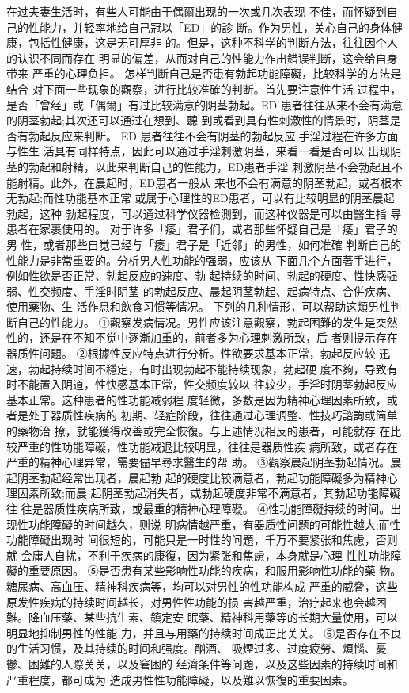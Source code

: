 \documentclass[12pt,UTF8]{ctexbook}
\begin{document}
在过夫妻生活时，有些人可能由于偶爾出现的一次或几次表现
不佳，而怀疑到自己的性能力，并轻率地给自己冠以「ED」的診
断。作为男性，关心自己的身体健康，包括性健康，这是无可厚非
的。但是，这种不科学的判断方法，往往因个人的认识不同而存在
明显的偏差，从而对自己的性能力作出錯误判断，这会给自身带来
严重的心理负担。
怎样判断自己是否患有勃起功能障礙，比较科学的方法是结合
对下面一些现象的觀察，进行比较准確的判断。首先要注意性生活
过程中，是否「曾经」或「偶爾」有过比较满意的阴茎勃起。ED
患者往往从来不会有满意的阴茎勃起;其次还可以通过在想到、聽
到或看到具有性刺激性的情景时，阴茎是否有勃起反应来判断。
ED 患者往往不会有阴茎的勃起反应;手淫过程在许多方面与性生
活具有同样特点，因此可以通过手淫刺激阴茎，来看一看是否可以
出现阴茎的勃起和射精，以此来判断自己的性能力，ED患者手淫
刺激阴茎不会勃起且不能射精。此外，在晨起时，ED患者一般从
来也不会有满意的阴茎勃起，或者根本无勃起;而性功能基本正常
或属于心理性的ED患者，可以有比较明显的阴茎晨起勃起，这种
勃起程度，可以通过科学仪器检測到，而这种仪器是可以由醫生指
导患者在家裹使用的。
对于许多「痿」君子们，或者那些怀疑自己是「痿」君子的男
性，或者那些自觉已经与「痿」君子是「近邻」的男性，如何准確
判断自己的性能力是非常重要的。分析男人性功能的强弱，应该从
下面几个方面著手进行，例如性欲是否正常、勃起反应的速度、勃
起持续的时间、勃起的硬度、性快感强弱、性交频度、手淫时阴茎
的勃起反应、晨起阴茎勃起、起病特点、合併疾病、使用藥物、生
活作息和飲食习惯等情况。
下列的几种情形，可以帮助这類男性判断自己的性能力。
①觀察发病情况。男性应该注意觀察，勃起困難的发生是突然
性的，还是在不知不觉中逐漸加重的，前者多为心理刺激所致，后
者则提示存在器质性问題。
②根據性反应特点进行分析。性欲要求基本正常，勃起反应较
迅速，勃起持续时间不穩定，有时出现勃起不能持续现象，勃起硬
度不夠，导致有时不能置入阴道，性快感基本正常，性交频度较以
往较少，手淫时阴茎勃起反应基本正常。这种患者的性功能减弱程
度轻微，多数是因为精神心理因素所致，或者是处于器质性疾病的
初期、轻症阶段，往往通过心理调整、性技巧諮詢或简单的藥物治
撩，就能獲得改善或完全恢復。与上述情况相反的患者，可能就存
在比较严重的性功能障礙，性功能减退比较明显，往往是器质性疾
病所致，或者存在严重的精神心理异常，需要儘早尋求醫生的帮
助。
③觀察晨起阴茎勃起情况。晨起阴茎勃起经常出现者，晨起勃
起的硬度比较满意者，勃起功能障礙多为精神心理因素所致;而晨
起阴茎勃起消失者，或勃起硬度非常不满意者，其勃起功能障礙往
往是器质性疾病所致，或最重的精神心理障礙。
④性功能障礙持续的时间。出现性功能障礙的时间越久，则说
明病情越严重，有器质性问题的可能性越大;而性功能障礙出现时
间很短的，可能只是一时性的问題，千万不要紧张和焦慮，否则就
会庸人自扰，不利于疾病的康復，因为紧张和焦慮，本身就是心理
性性功能障礙的重要原因。
⑤是否患有某些影响性功能的疾病，和服用影响性功能的藥
物。糖尿病、高血压、精神科疾病等，均可以对男性的性功能构成
严重的威脅，这些原发性疾病的持续时间越长，对男性性功能的损
害越严重，治疗起来也会越困難。降血压藥、某些抗生素、鎮定安
眠藥、精神科用藥等的长期大量使用，可以明显地抑制男性的性能
力，并且与用藥的持续时间成正比关关。
⑥是否存在不良的生活习惯，及其持续的时间和强度。酗酒、
吸煙过多、过度疲勞、煩惱、憂鬱、困難的人際关关，以及窘困的
经濟条件等问題，以及这些因素的持续时间和严重程度，都可成为
造成男性性功能障礙，以及難以恢復的重要因素。
\end{document}
